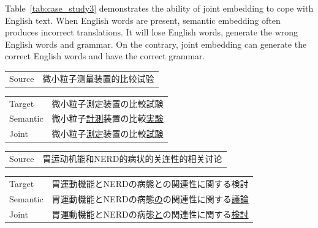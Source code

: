 \begin{CJK}{UTF8}{long}
    Table~\ref{tab:case_study3} demonstrates the ability of joint embedding to cope with English text. When English words are present, semantic embedding often produces incorrect translations. It will lose English words, generate the wrong English words and grammar. On the contrary, joint embedding can generate the correct English words and have the correct grammar.
\end{CJK}

\begin{table}[h]
    \centering

    \begin{CJK}{UTF8}{gbsn}
        \begin{tabularx}{\textwidth}{p{1.2cm}b}\toprule
            Source & 微小粒子测量装置的比较试验 \\
        \end{tabularx}
    \end{CJK}

    \begin{CJK}{UTF8}{long}
        \begin{tabularx}{\textwidth}{p{1.2cm}b}
            Target & 微小粒子測定装置の比較試験 \\
            Semantic & 微小粒子\underline{計測}装置の比較\underline{実験} \\
            Joint & 微小粒子\underline{測定}装置の比較\underline{試験} \\\midrule
        \end{tabularx}
    \end{CJK}

    \begin{CJK}{UTF8}{gbsn}
        \begin{tabularx}{\textwidth}{p{1.2cm}b}
            Source & 胃运动机能和NERD的病状的关连性的相关讨论 \\
        \end{tabularx}
    \end{CJK}

    \begin{CJK}{UTF8}{long}
        \begin{tabularx}{\textwidth}{p{1.2cm}b}
            Target & 胃運動機能とNERDの病態との関連性に関する検討 \\
            Semantic & 胃運動機能とNERDの病態\underline{の}の関連性に関する\underline{議論} \\
            Joint & 胃運動機能とNERDの病態\underline{と}の関連性に関する\underline{検討} \\\midrule
        \end{tabularx}
    \end{CJK}


\end{table}
